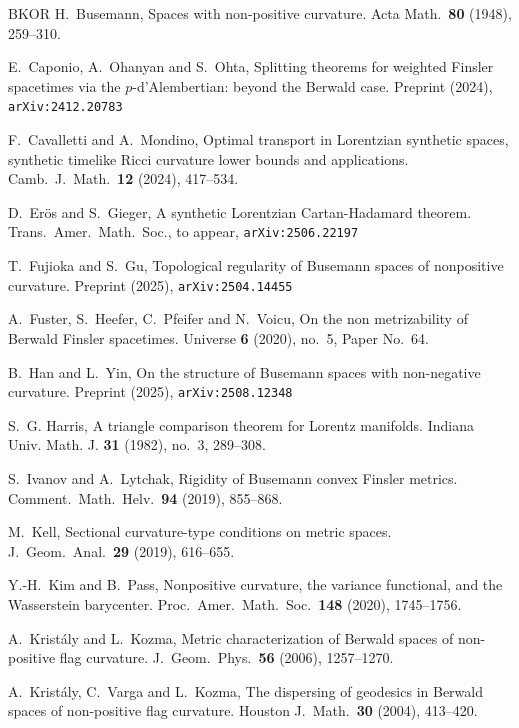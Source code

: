 \documentclass[a4paper,11pt]{article}
\numberwithin{equation}{section}
\theoremstyle{definition}
\theoremstyle{plain}
\begin{document}
\begin{thebibliography}{BKOR}
H.~Busemann,
Spaces with non-positive curvature.
Acta Math.\ \textbf{80} (1948), 259--310.

E.~Caponio, A.~Ohanyan and S.~Ohta,
Splitting theorems for weighted Finsler spacetimes via the $p$-d'Alembertian: beyond the Berwald case.
Preprint (2024), \texttt{arXiv:2412.20783}

F.~Cavalletti and A.~Mondino,
Optimal transport in Lorentzian synthetic spaces, synthetic timelike Ricci curvature lower bounds and applications.
Camb.\ J.\ Math.\ \textbf{12} (2024), 417--534.

D.~Er\"os and S.~Gieger,
A synthetic Lorentzian Cartan-Hadamard theorem. Trans.\ Amer.\ Math.\ Soc., to appear, \texttt{arXiv:2506.22197}

T.~Fujioka and S.~Gu,
Topological regularity of Busemann spaces of nonpositive
curvature.
Preprint (2025), \texttt{arXiv:2504.14455}

A.~Fuster, S.~Heefer, C.~Pfeifer and N.~Voicu,
On the non metrizability of Berwald Finsler spacetimes.
Universe \textbf{6} (2020), no.~5, Paper No.~64.

B.~Han and L.~Yin,
On the structure of Busemann spaces with non-negative
curvature.
Preprint (2025), \texttt{arXiv:2508.12348}

S.~G. Harris, 
A triangle comparison theorem for Lorentz manifolds. 
Indiana Univ. Math. J. {\bf 31} (1982), no.~3, 289--308.

S.~Ivanov and A.~Lytchak,
Rigidity of Busemann convex Finsler metrics.
Comment.\ Math.\ Helv.\ \textbf{94} (2019), 855--868.

M.~Kell,
Sectional curvature-type conditions on metric spaces.
J.\ Geom.\ Anal.\ \textbf{29} (2019), 616--655.

Y.-H.~Kim and B.~Pass,
Nonpositive curvature, the variance functional, and the Wasserstein barycenter.
Proc.\ Amer.\ Math.\ Soc.\ \textbf{148} (2020), 1745--1756.

A.~Krist\'aly and L.~Kozma,
Metric characterization of Berwald spaces of non-positive flag curvature.
J.\ Geom.\ Phys.\ \textbf{56} (2006), 1257--1270.

A.~Krist\'aly, C.~Varga and L.~Kozma,
The dispersing of geodesics in Berwald spaces of non-positive flag curvature.
Houston J.\ Math.\ \textbf{30} (2004), 413--420.


\end{thebibliography}
\end{document}
